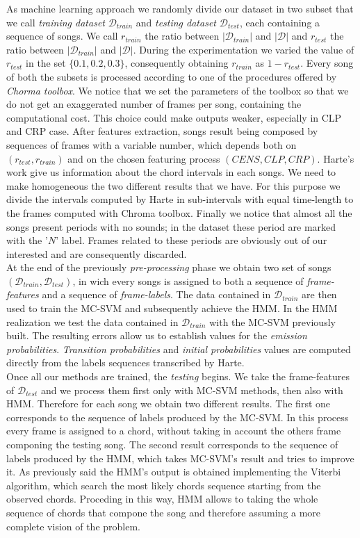 As machine learning approach we randomly divide our dataset in two subset that we call \textit{training dataset} $\mathcal{D}_{train}$ and \textit{testing dataset}  $\mathcal{D}_{test}$, each containing a sequence of songs. We call $r_{train}$ the ratio between $|\mathcal{D}_{train}|$ and $|\mathcal{D}|$ and $r_{test}$ the ratio between $|\mathcal{D}_{train}|$ and $|\mathcal{D}|$. During the experimentation we varied the value of $r_{test}$ in the set $\{0.1,0.2,0.3\}$, consequently obtaining $r_{train}$ as $1-r_{test}$. Every song of both the subsets is processed according to one of the procedures offered by \textit{Chorma toolbox}. We notice that we set the parameters of the toolbox so that we do not get an exaggerated number of frames per song, containing the computational cost. This choice could make outputs weaker, especially in CLP and CRP case. After features extraction, songs result being composed by sequences of frames with a variable number, which depends both on $(r_{test},r_{train})$ and on the chosen featuring process $(CENS,CLP,CRP)$. Harte's work give us information about the chord intervals in each songs. We need to make homogeneous the two different results that we have. For this purpose we divide the intervals computed by Harte in sub-intervals with equal time-length to the frames computed with Chroma toolbox. Finally we notice that almost all the songs present periods with no sounds; in the dataset these period are marked with the '$N$' label. Frames related to these periods are obviously out of our interested and are consequently discarded. \\
%
At the end of the previously \textit{pre-processing} phase we obtain two set of songs $(\mathcal{D}_{train},\mathcal{D}_{test})$, in wich every songs is assigned to both a sequence of \textit{frame-features} and a sequence of \textit{frame-labels}. The data contained in $\mathcal{D}_{train}$ are then used to train the MC-SVM and subsequently achieve the HMM. In the HMM realization we test the data contained in $\mathcal{D}_{train}$ with the MC-SVM previously built. The resulting errors allow us to establish values for the \textit{emission probabilities}. \textit{Transition probabilities} and \textit{initial probabilities} values are computed directly from the labels sequences transcribed by Harte. \\
%
Once all our methods are trained, the \textit{testing} begins. We take the frame-features of $\mathcal{D}_{test}$ and we process them first only with MC-SVM methods, then also with HMM. Therefore for each song we obtain two different results. The first one corresponds to the sequence of labels produced by the MC-SVM. In this process every frame is assigned to a chord, without taking in account the others frame componing the testing song. The second result corresponds to the sequence of labels produced by the HMM, which takes MC-SVM's result and tries to improve it. As previously said the HMM's output is obtained implementing the Viterbi algorithm, which search the most likely chords sequence starting from the observed chords. Proceding in this way, HMM allows to taking the whole sequence of chords that compone the song and therefore assuming a more complete vision of the problem.
